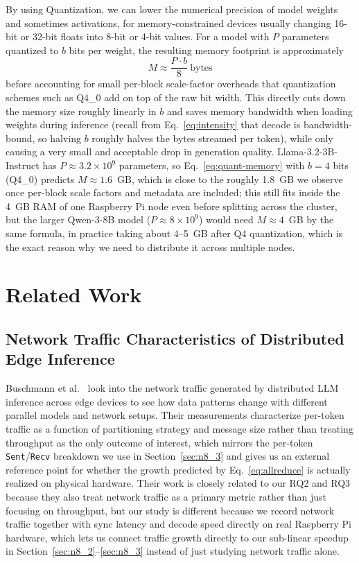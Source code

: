 \documentclass[11pt,a4paper]{article}
\begin{document}
By using Quantization, we can lower the numerical precision of model weights and sometimes activations, for memory-constrained devices usually changing 16-bit or 32-bit floats into 8-bit or 4-bit values. For a model with $P$ parameters quantized to $b$ bits per weight, the resulting memory footprint is approximately
\begin{equation}
M \approx \frac{P \cdot b}{8} \  \text{bytes}
\label{eq:quant-memory}
\end{equation}
before accounting for small per-block scale-factor overheads that quantization schemes such as Q4\_0 add on top of the raw bit width. This directly cuts down the memory size roughly linearly in $b$ and saves memory bandwidth when loading weights during inference (recall from Eq.~\ref{eq:intensity} that decode is bandwidth-bound, so halving $b$ roughly halves the bytes streamed per token), while only causing a very small and acceptable drop in generation quality. Llama-3.2-3B-Instruct has $P \approx 3.2 \times 10^{9}$ parameters, so Eq.~\ref{eq:quant-memory} with $b=4$ bits (Q4\_0) predicts $M \approx 1.6$~GB, which is close to the roughly 1.8~GB we observe once per-block scale factors and metadata are included; this still fits inside the 4~GB RAM of one Raspberry Pi node even before splitting across the cluster, but the larger Qwen-3-8B model ($P \approx 8 \times 10^{9}$) would need $M \approx 4$~GB by the same formula, in practice taking about 4--5~GB after Q4 quantization, which is the exact reason why we need to distribute it across multiple nodes.

\section{Related Work}\label{sec:n3}

\subsection{Network Traffic Characteristics of Distributed Edge Inference}\label{sec:n3_1}
Buschmann et al.~\cite{buschmann2025} look into the network traffic generated by distributed LLM inference across edge devices to see how data patterns change with different parallel models and network setups. Their measurements characterize per-token traffic as a function of partitioning strategy and message size rather than treating throughput as the only outcome of interest, which mirrors the per-token \texttt{Sent}/\texttt{Recv} breakdown we use in Section~\ref{sec:n8_3} and gives us an external reference point for whether the growth predicted by Eq.~\ref{eq:allreduce} is actually realized on physical hardware. Their work is closely related to our RQ2 and RQ3 because they also treat network traffic as a primary metric rather than just focusing on throughput, but our study is different because we record network traffic together with sync latency and decode speed directly on real Raspberry Pi hardware, which lets us connect traffic growth directly to our sub-linear speedup in Section~\ref{sec:n8_2}--\ref{sec:n8_3} instead of just studying network traffic alone.
\end{document}
